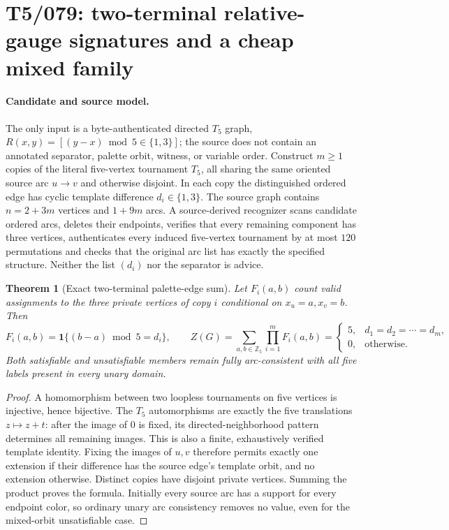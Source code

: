 \documentclass[11pt]{article}
\newtheorem{theorem}{Theorem}
\begin{document}
\section{T5/079: two-terminal relative-gauge signatures and a cheap mixed family}
\label{sec:twoterminal079}

\paragraph{Candidate and source model.}
The only input is a byte-authenticated directed $T_5$ graph,
$R(x,y)=[(y-x)\bmod5\in\{1,3\}]$; the source does not contain
an annotated separator, palette orbit, witness, or variable order.
Construct $m\ge1$ copies of the literal five-vertex tournament $T_5$,
all sharing the same oriented source arc $u\to v$ and otherwise
disjoint. In each copy the distinguished ordered edge has cyclic
template difference $d_i\in\{1,3\}$. The source graph contains
$n=2+3m$ vertices and $1+9m$ arcs. A source-derived recognizer scans
candidate ordered arcs, deletes their endpoints, verifies that every
remaining component has three vertices, authenticates every induced
five-vertex tournament by at most $120$ permutations and checks
that the original arc list has exactly the specified structure.
Neither the list $(d_i)$ nor the separator is advice.

\begin{theorem}[Exact two-terminal palette-edge sum]
Let $F_i(a,b)$ count valid assignments to the three private vertices
of copy $i$ conditional on $x_u=a,x_v=b$. Then
\[
 F_i(a,b)=\mathbf 1\{(b-a)\bmod5=d_i\},\qquad
 Z(G)=\sum_{a,b\in\mathbb Z_5}\prod_{i=1}^m F_i(a,b)
  =\begin{cases}
    5,&d_1=d_2=\cdots=d_m,\\
    0,&\text{otherwise}.
   \end{cases}
\]
Both satisfiable and unsatisfiable members remain fully
arc-consistent with all five labels present in every unary domain.
\end{theorem}
\begin{proof}
A homomorphism between two loopless tournaments on five vertices
is injective, hence bijective. The $T_5$ automorphisms are exactly
the five translations $z\mapsto z+t$: after the image of $0$
is fixed, its directed-neighborhood pattern determines all
remaining images. This is also a finite, exhaustively verified
template identity. Fixing the images of $u,v$ therefore permits
exactly one extension if their difference has the source edge's
template orbit, and no extension otherwise. Distinct copies have
disjoint private vertices. Summing the product proves the formula.
Initially every source arc has a support for every endpoint
color, so ordinary unary arc consistency removes no value,
even for the mixed-orbit unsatisfiable case.
\end{proof}
\end{document}
